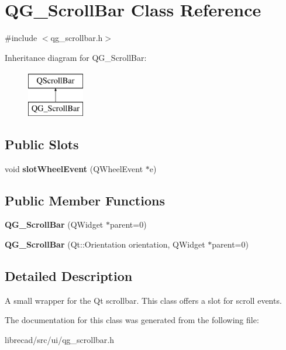 \hypertarget{classQG__ScrollBar}{\section{Q\-G\-\_\-\-Scroll\-Bar Class Reference}
\label{classQG__ScrollBar}
}


{\ttfamily \#include $<$qg\-\_\-scrollbar.\-h$>$}

Inheritance diagram for Q\-G\-\_\-\-Scroll\-Bar\-:\begin{figure}[H]
\begin{center}
\leavevmode
\includegraphics[height=2.000000cm]{classQG__ScrollBar}
\end{center}
\end{figure}
\subsection*{Public Slots}
\begin{DoxyCompactItemize}
\item 
\hypertarget{classQG__ScrollBar_a28b31b830c264688cbc6a14fe6f0a13a}{void {\bfseries slot\-Wheel\-Event} (Q\-Wheel\-Event $\ast$e)}\label{classQG__ScrollBar_a28b31b830c264688cbc6a14fe6f0a13a}

\end{DoxyCompactItemize}
\subsection*{Public Member Functions}
\begin{DoxyCompactItemize}
\item 
\hypertarget{classQG__ScrollBar_acce8054529c3c76d0c09e7fb2ad8e73b}{{\bfseries Q\-G\-\_\-\-Scroll\-Bar} (Q\-Widget $\ast$parent=0)}\label{classQG__ScrollBar_acce8054529c3c76d0c09e7fb2ad8e73b}

\item 
\hypertarget{classQG__ScrollBar_ab0619aa10f20402d42632f8c681b7e82}{{\bfseries Q\-G\-\_\-\-Scroll\-Bar} (Qt\-::\-Orientation orientation, Q\-Widget $\ast$parent=0)}\label{classQG__ScrollBar_ab0619aa10f20402d42632f8c681b7e82}

\end{DoxyCompactItemize}


\subsection{Detailed Description}
A small wrapper for the Qt scrollbar. This class offers a slot for scroll events. 

The documentation for this class was generated from the following file\-:\begin{DoxyCompactItemize}
\item 
librecad/src/ui/qg\-\_\-scrollbar.\-h\end{DoxyCompactItemize}
